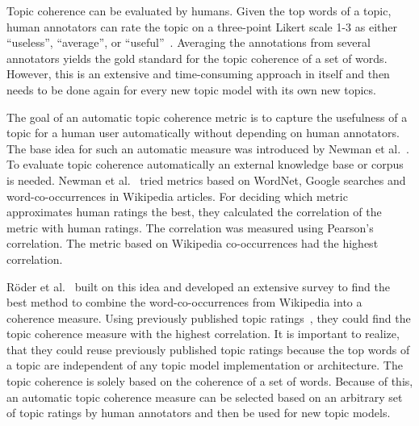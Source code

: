 \documentclass[
        a4paper,
        titlepage,
        twoside,
        parskip,
        numbers=noenddot
        ]{scrbook}
\theoremstyle{break}
\begin{document}
Topic coherence can be evaluated by humans.
Given the top words of a topic, human annotators can rate the topic on a three-point Likert scale 1-3 as either ``useless'', ``average'', or ``useful''~\cite{Aletras2013}.
Averaging the annotations from several annotators yields the gold standard for the topic coherence of a set of words.
However, this is an extensive and time-consuming approach in itself and then needs to be done again for every new topic model with its own new topics.

The goal of an automatic topic coherence metric is to capture the usefulness of a topic for a human user automatically without depending on human annotators.
The base idea for such an automatic measure was introduced by Newman et al.~\cite{Newman2010}.
To evaluate topic coherence automatically an external knowledge base or corpus is needed.
Newman et al.~\cite{Newman2010} tried metrics based on WordNet, Google searches and word-co-occurrences in Wikipedia articles.
For deciding which metric approximates human ratings the best, they calculated the correlation of the metric with human ratings.
The correlation was measured using Pearson's correlation.
The metric based on Wikipedia co-occurrences had the highest correlation.



Röder et al.~\cite{Roder2015} built on this idea and developed an extensive survey to find the best method to combine the word-co-occurrences from Wikipedia into a coherence measure.
Using previously published topic ratings~\cite{Aletras2013,Chang2009,Newman2010,Rosner2013}, they could find the topic coherence measure with the highest correlation.
It is important to realize, that they could reuse previously published topic ratings because the top words of a topic are independent of any topic model implementation or architecture.
The topic coherence is solely based on the coherence of a set of words.
Because of this, an automatic topic coherence measure can be selected based on an arbitrary set of topic ratings by human annotators and then be used for new topic models.
\end{document}
